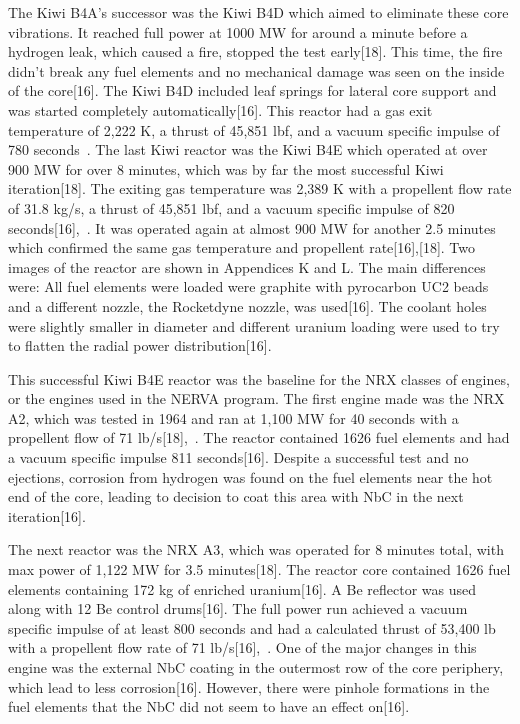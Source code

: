 \documentclass{article}
\begin{document}
The Kiwi B4A's successor was the Kiwi B4D which aimed to eliminate these core vibrations. It reached full power at 1000 MW for around a minute before a hydrogen leak, which caused a fire, stopped the test early[18]. This time, the fire didn't break any fuel elements and no mechanical damage was seen on the inside of the core[16]. The Kiwi B4D included leaf springs for lateral core support and was started completely automatically[16]. This reactor had a gas exit temperature of 2,222 K, a thrust of 45,851 lbf, and a vacuum specific impulse of 780 seconds~\cite{presrovernerva}.
The last Kiwi reactor was the Kiwi B4E which operated at over 900 MW for over 8 minutes, which was by far the most successful Kiwi iteration[18]. The exiting gas temperature was 2,389 K with a propellent flow rate of 31.8 kg/s, a thrust of 45,851 lbf, and a vacuum specific impulse of 820 seconds[16],~\cite{presrovernerva}. It was operated again at almost 900 MW for another 2.5 minutes which confirmed the same gas temperature and propellent rate[16],[18]. Two images of the reactor are shown in Appendices K and L. The main differences were: All fuel elements were loaded were graphite with pyrocarbon UC2 beads and a different nozzle, the Rocketdyne nozzle, was used[16]. The coolant holes were slightly smaller in diameter and different uranium loading were used to try to flatten the radial power distribution[16].


    This successful Kiwi B4E reactor was the baseline for the NRX classes of engines, or the engines used in the NERVA program. The first engine made was the NRX A2, which was tested in 1964 and ran at 1,100 MW for 40 seconds with a propellent flow of 71 lb/s[18],~\cite{ledbetter1969nerva}. The reactor contained 1626 fuel elements and had a vacuum specific impulse 811 seconds[16]. Despite a successful test and no ejections, corrosion from hydrogen was found on the fuel elements near the hot end of the core, leading to decision to coat this area with NbC in the next iteration[16].


    The next reactor was the NRX A3, which was operated for 8 minutes total, with max power of 1,122 MW for 3.5 minutes[18]. The reactor core contained 1626 fuel elements containing 172 kg of enriched uranium[16]. A Be reflector was used along with 12 Be control drums[16]. The full power run achieved a vacuum specific impulse of at least 800 seconds and had a calculated thrust of 53,400 lb with a propellent flow rate of 71 lb/s[16],~\cite{ledbetter1969nerva}. One of the major changes in this engine was the external NbC coating in the outermost row of the core periphery, which lead to less corrosion[16]. However, there were pinhole formations in the fuel elements that the NbC did not seem to have an effect on[16]. 
\end{document}
